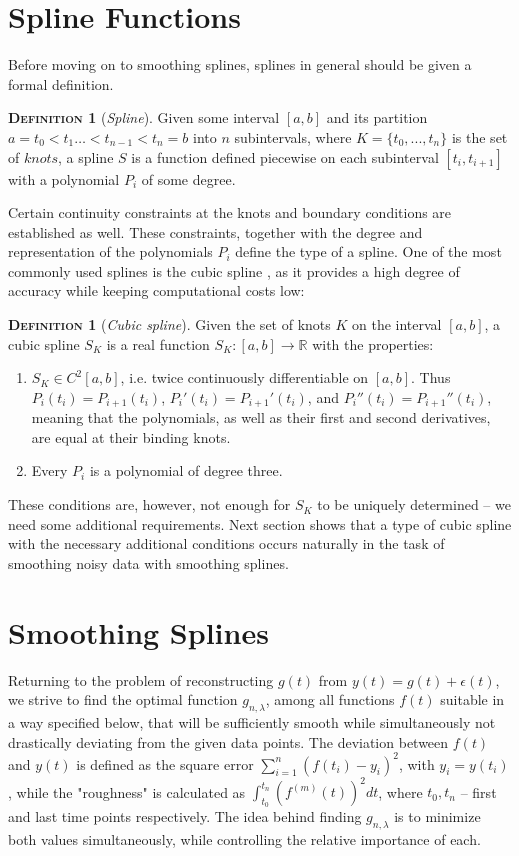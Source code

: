 \documentclass[11pt,leqno]{book}
\theoremstyle{definition}
\theoremstyle{plain}
\theoremstyle{definition}
\newtheorem{definition}[theorem]{\scshape{Definition}}
\begin{document}
{\section{Spline Functions}
Before moving on to smoothing splines, splines in general should be given a formal definition.
\begin{definition}[\textit{Spline}]Given some interval $[a, b]$ and its partition ${a = t_0 < t_1 … < t_{n-1}< t_n = b}$ into $n$ subintervals, where $K = \{t_0,..., t_n\}$ is the set of $\textit{knots}$, a spline $S$ is a function defined piecewise on each subinterval $[t_i, t_{i+1}]$ with a polynomial $P_i$ of some degree. \end{definition}
\noindent Certain continuity constraints at the knots and boundary conditions are established as well. These constraints, together with the degree and representation of the polynomials $P_i$ define the type of a spline. One of the most commonly used splines is the cubic spline \cite{bulirschStoer}, as it provides a high degree of accuracy while keeping computational costs low:
\begin{definition}[\textit{Cubic spline}]
Given the set of knots $K$ on the interval $[a, b]$, a cubic spline $S_K$ is a real function $S_K: [a, b]\to \mathbb{R}$ with the properties: 
\begin{enumerate}[label=\alph*)]
    \item $S_K \in C^2[a, b]$, i.e. twice continuously differentiable on $[a, b].$ Thus $P_i(t_i) = P_{i+1}(t_i)$, $P_i'(t_i) = P_{i+1}'(t_i)$, and $P_i''(t_i) = P_{i+1}''(t_i)$, meaning that the polynomials, as well as their first and second derivatives, are equal at their binding knots.
    \item Every $P_i$ is a polynomial of degree three.
\end{enumerate}
\end{definition}
\noindent These conditions are, however, not enough for $S_K$ to be uniquely determined -- we need some additional requirements. Next section shows that a type of cubic spline with the necessary additional conditions occurs naturally in the task of smoothing noisy data with smoothing splines.
\section{Smoothing Splines}
Returning to the problem of reconstructing $g(t)$ from $y(t) = g(t) + \epsilon(t)$, we strive to find the optimal function $g_{n,\lambda}$, among all functions $f(t)$ suitable in a way specified below, that will be sufficiently smooth while simultaneously not drastically deviating from the given data points. The deviation between $f(t)$ and ${y}(t)$ is defined as the square error $\sum_{i=1}^{n}{(f(t_i) - {y}_i)^2}$, with ${y}_i = {y}(t_i)$, while the "roughness" is calculated as $\int_{t_0}^{t_n}{(f^{(m)}(t))^2dt}$, where $t_0, t_n$ -- first and last time points respectively. The idea behind finding $g_{n,\lambda}$ is to minimize both values simultaneously, while controlling the relative importance of each.

}
\end{document}
